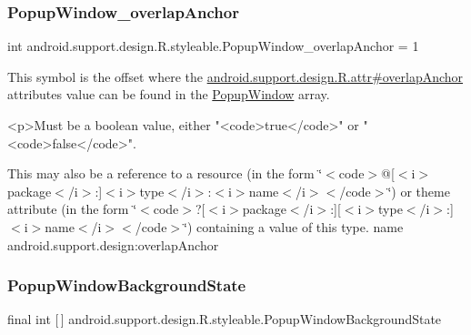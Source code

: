 \subsubsection{\texorpdfstring{Popup\+Window\+\_\+overlap\+Anchor}{PopupWindow\_overlapAnchor}}
{\footnotesize\ttfamily int android.\+support.\+design.\+R.\+styleable.\+Popup\+Window\+\_\+overlap\+Anchor = 1\hspace{0.3cm}{\ttfamily [static]}}

This symbol is the offset where the \hyperlink{classandroid_1_1support_1_1design_1_1R_1_1attr_a6431f4eaa762dbbcc2472210e6de4d03}{android.\+support.\+design.\+R.\+attr\#overlap\+Anchor} attribute\textquotesingle{}s value can be found in the \hyperlink{classandroid_1_1support_1_1design_1_1R_1_1styleable_aa75bc963c35e5bb705cefe081e851f59}{Popup\+Window} array.

\begin{DoxyVerb}      <p>Must be a boolean value, either "<code>true</code>" or "<code>false</code>".
\end{DoxyVerb}
 

This may also be a reference to a resource (in the form \char`\"{}$<$code$>$@\mbox{[}$<$i$>$package$<$/i$>$\+:\mbox{]}$<$i$>$type$<$/i$>$\+:$<$i$>$name$<$/i$>$$<$/code$>$\char`\"{}) or theme attribute (in the form \char`\"{}$<$code$>$?\mbox{[}$<$i$>$package$<$/i$>$\+:\mbox{]}\mbox{[}$<$i$>$type$<$/i$>$\+:\mbox{]}$<$i$>$name$<$/i$>$$<$/code$>$\char`\"{}) containing a value of this type.  name android.\+support.\+design\+:overlap\+Anchor \mbox{\label{classandroid_1_1support_1_1design_1_1R_1_1styleable_a0fa0763898706ab0c593a428f940c3e1}} 
\subsubsection{\texorpdfstring{Popup\+Window\+Background\+State}{PopupWindowBackgroundState}}
{\footnotesize\ttfamily final int \mbox{[}$\,$\mbox{]} android.\+support.\+design.\+R.\+styleable.\+Popup\+Window\+Background\+State\hspace{0.3cm}{\ttfamily [static]}}

